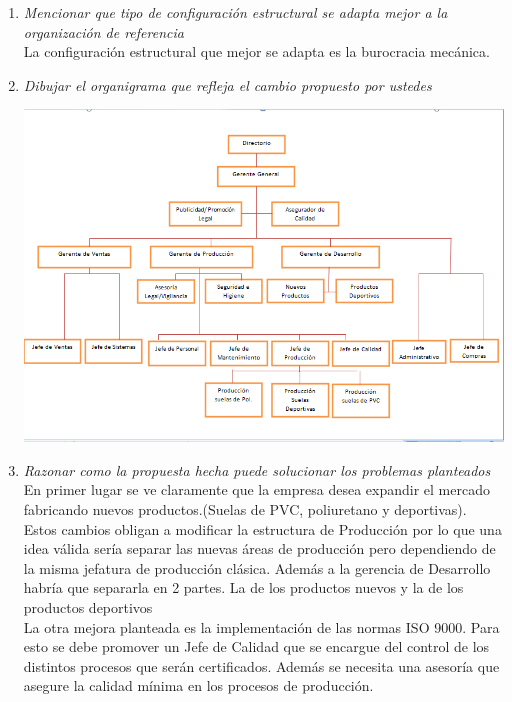 \documentclass[a4paper,10pt]{article}
\begin{document}
\begin{enumerate}
			\item \textit{Mencionar que tipo de configuración estructural se adapta mejor a la organización de referencia}\\
			La configuración estructural que mejor se adapta es la burocracia mecánica.

						
			\item \textit{Dibujar el organigrama que refleja el cambio propuesto por ustedes}
		
			
				\includegraphics[width=1\textwidth]{imagenes/SolucionPropuestaGringo.png}
				
				
				
						
			\item \textit{Razonar como la propuesta hecha puede solucionar los problemas planteados}\\
			
			En primer lugar se ve claramente que la empresa desea expandir el mercado fabricando nuevos productos.(Suelas de PVC, poliuretano y deportivas). Estos cambios obligan a modificar la estructura de Producción por lo que una idea válida sería separar las nuevas áreas de producción pero dependiendo de la misma jefatura de producción clásica. Además a la gerencia de Desarrollo habría que separarla en 2 partes. La de los productos nuevos y la de los productos deportivos\\
			La otra mejora planteada es la implementación de las normas ISO 9000. Para esto se debe promover un Jefe de Calidad que se encargue del control de los distintos procesos que serán certificados.
			Además se necesita una asesoría que asegure la calidad mínima en los procesos de producción.\\ 
			

			
			\end{enumerate}
		
\end{document}
